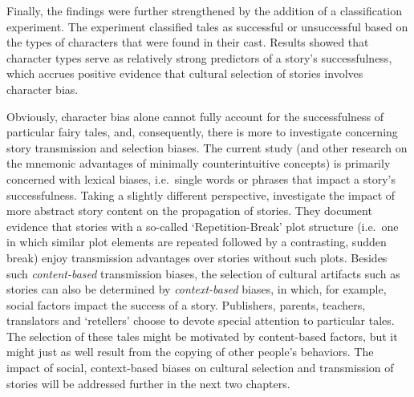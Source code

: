 Finally, the findings were further strengthened by the addition of a classification experiment. The experiment classified tales as successful or unsuccessful based on the types of characters that were found in their cast. Results showed that character types serve as relatively strong predictors of a story's successfulness, which accrues positive evidence that cultural selection of stories involves character bias.

Obviously, character bias alone cannot fully account for the successfulness of particular fairy tales, and, consequently, there is more to investigate concerning story transmission and selection biases. The current study (and other research on the mnemonic advantages of minimally counterintuitive concepts) is primarily concerned with lexical biases, i.e.\ single words or phrases that impact a story's successfulness. Taking a slightly different perspective, \citeauthor{Loewenstein:2009} investigate the impact of more abstract story content on the propagation of stories.\autocite{Loewenstein:2009,Loewenstein:2011} They document evidence that stories with a so-called `Repetition-Break' plot structure (i.e.\ one in which similar plot elements are repeated followed by a contrasting, sudden break) enjoy transmission advantages over stories without such plots. Besides such \emph{content-based} transmission biases, the selection of cultural artifacts such as stories can also be determined by \emph{context-based} biases, in which, for example, social factors impact the success of a story.\autocite[For the distinction between context-based and content-based bias, cf.\ Chapter \ref{ch:story-networks} and][]{henrich:2003} Publishers, parents, teachers, translators and `retellers' choose to devote special attention to particular tales. The selection of these tales might be motivated by content-based factors, but it might just as well result from the copying of other people's behaviors. The impact of social, context-based biases on cultural selection and transmission of stories will be addressed further in the next two chapters.

